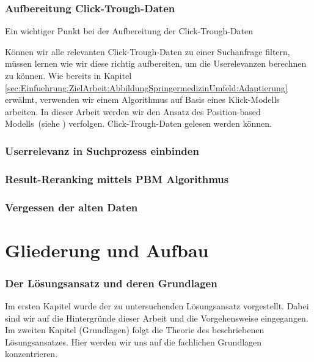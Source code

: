 \subsubsection{Aufbereitung Click-Trough-Daten}
\label{sec:Einfuehrung:Methodik:Click-Trough-Daten}

Ein wichtiger Punkt bei der Aufbereitung der Click-Trough-Daten 

Können wir alle relevanten Click-Trough-Daten zu einer Suchanfrage filtern, müssen lernen wie wir diese richtig aufbereiten, um die Userelevanzen berechnen zu können. Wie bereits in Kapitel \ref{sec:Einfuehrung:ZielArbeit:AbbildungSpringermedizinUmfeld:Adaptierung} erwähnt, verwenden wir einem Algorithmus auf Basis eines Klick-Modells arbeiten. In dieser Arbeit werden wir den Ansatz des Position-based Modells~(siehe \cite{pbm}) verfolgen.  Click-Trough-Daten gelesen werden können. 

\subsubsection{Userrelevanz in Suchprozess einbinden}
\label{sec:Einfuehrung:Methodik:SucheEinbinden}


\subsubsection{Result-Reranking mittels PBM Algorithmus}
\label{sec:Einfuehrung:Methodik:Result-RerankingPBM}

\subsubsection{Vergessen der alten Daten}
\label{sec:Einfuehrung:Vergessen}


\section{Gliederung und Aufbau}
\label{sec:Einfuehrung:GliederungAufbau}

\subsubsection{Der Lösungsansatz und deren Grundlagen}
\label{sec:Einfuehrung:GliederungAufbau:Loesungsansatz}

Im ersten Kapitel wurde der zu untersuchenden Lösungsansatz vorgestellt. Dabei sind wir auf die Hintergründe dieser Arbeit und die Vorgehensweise eingegangen. Im zweiten Kapitel (Grundlagen) folgt die Theorie des beschriebenen Lösungsansatzes. Hier werden wir uns auf die fachlichen Grundlagen konzentrieren. 

